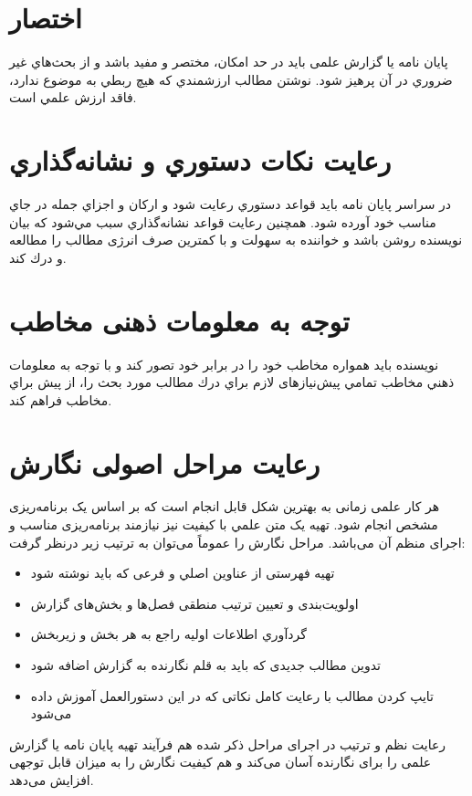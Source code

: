 \section{اختصار}

پایان نامه یا گزارش علمی بايد در حد امكان، مختصر و مفيد باشد و از بحث‌هاي غير ضروري در آن پرهيز شود. نوشتن مطالب ارزشمندي كه هيچ ربطي به موضوع ندارد، فاقد ارزش علمي است.
\section{رعایت نكات دستوري و نشانه‌گذاري}
در سراسر پایان نامه بايد قواعد دستوري رعايت شود و اركان و اجزاي جمله در جاي مناسب خود آورده شود. همچنین رعايت قواعد نشانه‌گذاري سبب مي‌شود كه بيان نويسنده روشن باشد و خواننده به سهولت و با کمترین صرف انرژی مطالب را مطالعه و درك كند.
\section{توجه به معلومات ذهنی مخاطب}
نويسنده بايد همواره مخاطب خود را در برابر خود تصور كند و با توجه به معلومات ذهني مخاطب  تمامي پیش‌نیازهای لازم براي درك مطالب مورد بحث را، از پیش براي مخاطب فراهم كند.

\section{رعایت مراحل اصولی نگارش}
هر کار علمی زمانی به بهترین شکل قابل انجام است که بر اساس یک برنامه‌ریزی مشخص انجام شود. تهیه یک متن علمي با کیفیت نیز نیازمند برنامه‌ریزی مناسب و اجرای منظم آن می‌باشد. مراحل نگارش را عموماً می‌توان به ترتیب زیر درنظر گرفت:
\begin{itemize}


\item	تهيه فهرستی از عناوین اصلي و فرعی که باید نوشته شود
\item 	اولویت‌بندی و تعیین ترتیب منطقی فصل‌ها و بخش‌های گزارش
\item 	گردآوري اطلاعات اولیه راجع به هر بخش و زیربخش
\item 	تدوین مطالب جدیدی که باید به قلم نگارنده به گزارش اضافه شود
\item 	تایپ كردن مطالب با رعایت کامل نکاتی که در این دستورالعمل آموزش داده می‌شود
\end{itemize}
رعایت نظم و ترتیب در اجرای مراحل ذکر شده هم فرآیند تهیه پایان نامه یا گزارش علمی را برای نگارنده آسان می‌کند و هم کیفیت نگارش را به میزان قابل توجهی افزایش می‌دهد.

















